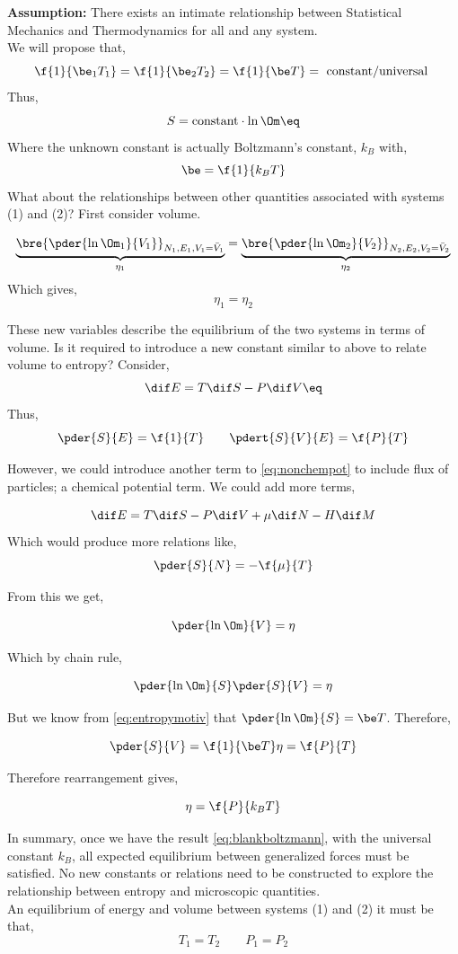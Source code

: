 \documentclass{article}
\begin{document}
\textbf{Assumption:} There exists an intimate relationship between Statistical Mechanics and Thermodynamics for all and any system. \\
We will propose that,
\[ \f{1}{\be_1T_1} = \f{1}{\be_2T_2} = \f{1}{\be T} = \text{ constant/universal } \]
Thus,
\[ S = \text{constant}\cdot \ln \Om \eq \label{eq:blankboltzmann} \]
Where the unknown constant is actually Boltzmann's constant, $k_B$ with,
\[  \be = \f{1}{k_B T} \]
What about the relationships between other quantities associated with systems (1) and (2)? First consider volume.

\[ \underbrace{\bre{\pder{\ln \Om_1}{V_1}}_{N_1, E_1, V_1 = \bar{V}_1}}_{\eta_1} = \underbrace{\bre{\pder{\ln \Om_2}{V_2}}_{N_2, E_2, V_2 = \bar{V}_2}}_{\eta_2} \]
Which gives,
\[ \eta_1 = \eta_2 \]

These new variables describe the equilibrium of the two systems in terms of volume. Is it required to introduce a new constant similar to above to relate volume to entropy? Consider,
\[ \dif E = T \dif S - P \dif V \eq \label{eq:nonchempot}\]
Thus,
\[ \pder{S}{E} = \f{1}{T} \qquad \pdert{S}{V}{E} = \f{P}{T} \]

However, we could introduce another term to \eqref{eq:nonchempot} to include flux of particles; a chemical potential term. We could add more terms,

\[ \dif E = T \dif S - P \dif V  + \mu \dif N - H \dif M\]
Which would produce more relations like,
\[ \pder{S}{N} = - \f{\mu}{T}\]

From this we get,

\[ \pder{\ln\Om}{V} = \eta \]

Which by chain rule,

\[ \pder{\ln\Om}{S}\pder{S}{V} = \eta \]

But we know from \eqref{eq:entropymotiv} that $\pder{\ln\Om}{S} = \be T$. Therefore,

\[ \pder{S}{V} = \f{1}{\be T} \eta = \f{P}{T} \]

Therefore rearrangement gives,

\[ \eta = \f{P}{k_B T} \]

In summary, once we have the result \eqref{eq:blankboltzmann}, with the universal constant $k_B$, all expected equilibrium between generalized forces must be satisfied. No new constants or relations need to be constructed to explore the relationship between entropy and microscopic quantities. \\

An equilibrium of energy and volume between systems (1) and (2) it must be that,
\[ T_1 = T_2 \qquad P_1 = P_2 \]
\end{document}
